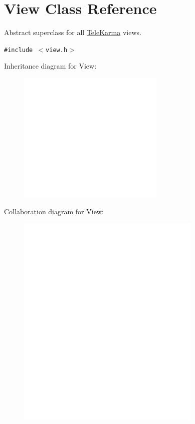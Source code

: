 \hypertarget{classView}{
\section{View Class Reference}
\label{classView}
}
Abstract superclass for all \hyperlink{classTeleKarma}{TeleKarma} views.  


{\tt \#include $<$view.h$>$}

Inheritance diagram for View:\nopagebreak
\begin{figure}[H]
\begin{center}
\leavevmode
\includegraphics[width=198pt]{classView__inherit__graph}
\end{center}
\end{figure}
Collaboration diagram for View:\nopagebreak
\begin{figure}[H]
\begin{center}
\leavevmode
\includegraphics[width=250pt]{classView__coll__graph}
\end{center}
\end{figure}

